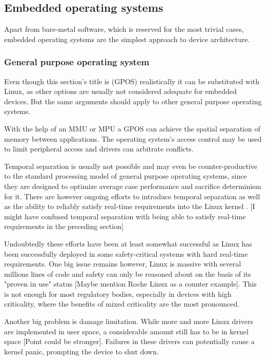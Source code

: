 \subsection{Embedded operating systems}
Apart from bare-metal software, which is reserved for the most trivial cases,  embedded operating systems are the simplest approach to device architecture. 
\subsubsection{General purpose operating system}
Even though this section's title is  (GPOS) realistically it can be substituted with Linux, as other options are usually not considered adequate for embedded devices. But the same arguments should apply to other general purpose operating systems.

With the help of an \gls{MMU} or \gls{MPU}  a \gls{GPOS} can achieve the spatial separation of memory between applications. The operating system's access control may be used to limit peripheral access and drivers can arbitrate conflicts. 

Temporal separation is usually not possible and may even be counter-productive to the standard processing model of general purpose operating systems, since they are designed to optimize average case performance and sacrifice determinism for it. There are however ongoing efforts to introduce temporal separation as well as the ability to reliably satisfy real-time requirements into the Linux kernel \cite{SiroArthur.2007}.
[I might have confused temporal separation with being able to satisfy real-time requirements in the preceding section]

Undoubtedly these efforts have been at least somewhat successful as Linux has been successfully deployed in some safety-critical systems with hard real-time requirements. One big issue remains however, Linux is massive with several millions lines of code and safety can only be reasoned about on the basis of its "proven in use" status [Maybe mention Roche Linux as a counter example]. This is not enough for most regulatory bodies, especially in devices with high criticality, where the benefits of mixed criticality are the most pronounced.

Another big problem is damage limitation. While more and more Linux drivers are implemented in user space, a considerable amount still has to be in kernel space [Point could be stronger]. Failures in these drivers can potentially cause a kernel panic, prompting the device to shut down. 

